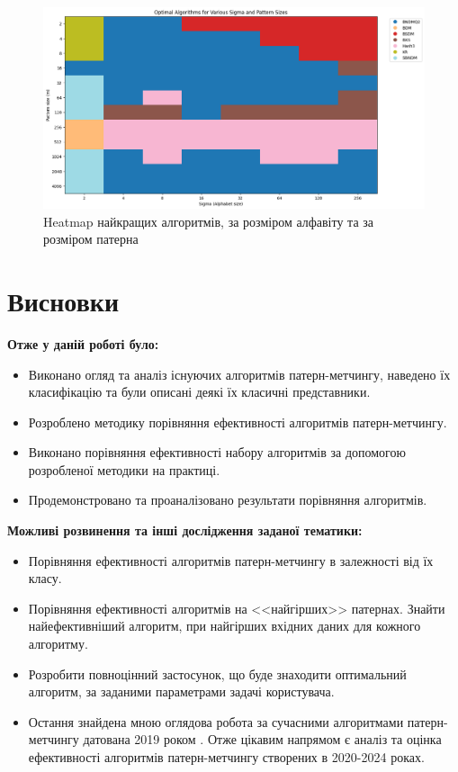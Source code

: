 \documentclass[a4paper,14pt]{extarticle} %
\begin{document}
			\begin{figure}[H]
				\centering
				\includegraphics[width=1\textwidth]{images/sigma_results.png}
				\caption{Heatmap найкращих алгоритмів, за розміром алфавіту та за розміром патерна}
				\label{fig:sigma_results}
			\end{figure}
	\newpage
    \section*{Висновки}
	\textbf{Отже у даній роботі було:}
	\begin{itemize}
		\item Виконано огляд та аналіз існуючих алгоритмів патерн-метчингу, наведено їх класифікацію та були описані деякі їх класичні представники.
		\item Розроблено методику порівняння ефективності алгоритмів патерн-метчингу.
		\item Виконано порівняння ефективності набору алгоритмів за допомогою розробленої методики на практиці.
		\item Продемонстровано та проаналізовано результати порівняння алгоритмів.
	\end{itemize}

	\textbf{Можливі розвинення та інші дослідження заданої тематики:}
	\begin{itemize}
		\item Порівняння ефективності алгоритмів патерн-метчингу в залежності від їх класу.
		\item Порівняння ефективності алгоритмів на <<найгірших>> патернах. Знайти найефективніший алгоритм, при найгірших вхідних даних для кожного алгоритму.
		\item Розробити повноцінний застосунок, що буде знаходити оптимальний алгоритм, за заданими параметрами задачі користувача.
		\item Остання знайдена мною оглядова робота за сучасними алгоритмами патерн-метчингу датована 2019 роком \cite{2019survey}. Отже цікавим напрямом є аналіз та оцінка ефективності алгоритмів патерн-метчингу створених в 2020-2024 роках.
	\end{itemize}
\end{document}
